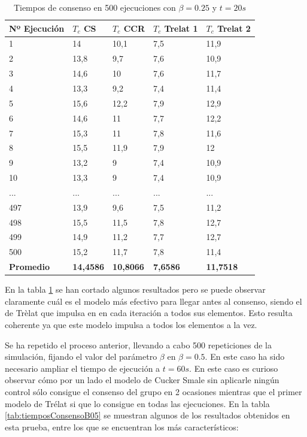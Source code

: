 \begin{table}[!ht]
\caption{Tiempos de consenso en 500 ejecuciones con $\beta=0.25$ y $t=20s$}
    \centering
    \begin{tabular}{|l|l|l|l|l|}
    \hline
        \textbf{Nº Ejecución} & \textbf{$T_c$ CS} & \textbf{$T_c$ CCR} & \textbf{$T_c$ Trelat 1} & \textbf{$T_c$ Trelat 2} \\ \hline
        1 & 14 & 10,1 & 7,5 & 11,9 \\ \hline
        2 & 13,8 & 9,7 & 7,6 & 10,9 \\ \hline
        3 & 14,6 & 10 & 7,6 & 11,7 \\ \hline
        4 & 13,3 & 9,2 & 7,4 & 11,4 \\ \hline
        5 & 15,6 & 12,2 & 7,9 & 12,9 \\ \hline
        6 & 14,6 & 11 & 7,7 & 12,2 \\ \hline
        7 & 15,3 & 11 & 7,8 & 11,6 \\ \hline
        8 & 15,5 & 11,9 & 7,9 & 12 \\ \hline
        9 & 13,2 & 9 & 7,4 & 10,9 \\ \hline
        10 & 13,3 & 9 & 7,4 & 10,9 \\ \hline \hline
        ... & ... & ... & ... & ...\\ \hline \hline
        497 & 13,9 & 9,6 & 7,5 & 11,2 \\ \hline
        498 & 15,5 & 11,5 & 7,8 & 12,7 \\ \hline
        499 & 14,9 & 11,2 & 7,7 & 12,7 \\ \hline
        500 & 15,2 & 11,7 & 7,8 & 11,4 \\ \hline \hline
        \textbf{Promedio} & \textbf{14,4586} & \textbf{10,8066} & \textbf{7,6586} & \textbf{11,7518} \\ \hline
    \end{tabular}
    \label{tab:tiemposConsenso}
\end{table}

En la tabla \ref{tab:tiemposConsenso} se han cortado algunos resultados pero se puede observar claramente cuál es el modelo más efectivo para llegar antes al consenso, siendo el de Trèlat que impulsa en en cada iteración a todos sus elementos. Esto resulta coherente ya que este modelo impulsa a todos los elementos a la vez.

Se ha repetido el proceso anterior, llevando a cabo  500 repeticiones de la simulación, fijando el valor del parámetro $\beta$ en  $\beta=0.5$. En este caso ha sido necesario ampliar el tiempo de ejecución a $t=60s$. En este caso es curioso observar cómo por un lado el modelo de Cucker Smale sin aplicarle ningún control sólo consigue el consenso del grupo en 2 ocasiones mientras que el primer modelo de Trélat si que lo consigue en todas las ejecuciones. En la tabla \ref{tab:tiemposConsensoB05} se muestran algunos de los resultados obtenidos en esta prueba, entre los que se encuentran los más característicos:

